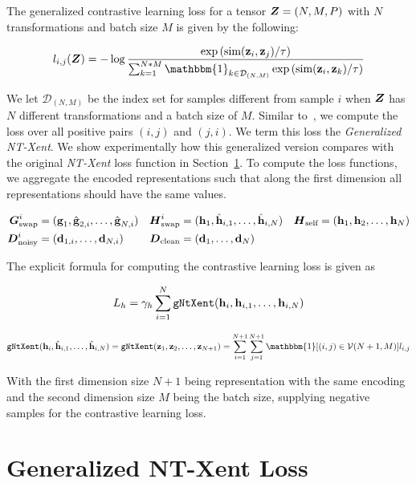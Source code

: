 \documentclass[11pt]{article}
\begin{document}
The generalized contrastive learning loss for a tensor $\boldsymbol{Z} = (N,M,P)$ with $N$ transformations and batch size $M$ is given by the following:

\begin{align}
  l_{i,j}(\mZ)
  =
  -\log
  \frac{
  \exp\left(\text{sim}(\vz_i,\vz_j)/\tau\right)
  }{
  \sum^{N*M}_{k=1}\mathbbm{1}_{k \in \mathcal{D}_{(N,M)}}\exp\left(\text{sim}(\vz_i,\vz_k)/\tau\right)
  }
\end{align}

We let $\mathcal{D}_{(N,M)}$ be the index set for samples different from sample $i$ when $\boldsymbol{Z}$ has $N$ different transformations and a batch size of $M$. Similar to~\cite{chen2020simple}, we compute the loss over all positive pairs $(i,j)$ and $(j,i)$. We term this loss the \emph{Generalized NT-Xent}.  We show experimentally how this generalized version compares with the original \emph{NT-Xent} loss function in Section~\ref{sec:gen_nt_xent}. To compute the loss functions, we aggregate the encoded representations such that along the first dimension all representations should have the same values.

\begin{align}\nonumber
  \boldsymbol{G}_{\text{swap}}^i &= (\boldsymbol{\mathrm{g}}_1,\hat{\boldsymbol{\mathrm{g}}}_{2,i},\ldots,\hat{\boldsymbol{\mathrm{g}}}_{N,i})                                 &
  \boldsymbol{H}_{\text{swap}}^i &= (\boldsymbol{\mathrm{h}}_1,\hat{\boldsymbol{\mathrm{h}}}_{i,1},\ldots,\hat{\boldsymbol{\mathrm{h}}}_{i,N}) & \boldsymbol{H}_{\text{self}} &= (\boldsymbol{\mathrm{h}}_1,\boldsymbol{\mathrm{h}}_2,\ldots,\boldsymbol{\mathrm{h}}_N)
   \\\nonumber                          
  \boldsymbol{D}_{\text{noisy}}^i &= (\boldsymbol{\mathrm{d}}_{1,i},\ldots,\boldsymbol{\mathrm{d}}_{N,i})
  &                     
  \boldsymbol{D}_{\text{clean}} &= (\boldsymbol{\mathrm{d}}_1,\ldots,\boldsymbol{\mathrm{d}}_N)
\end{align}

The explicit formula for computing the contrastive learning loss is given as

\[
  L_h = \gamma_h \sum_{i=1}^N {\tt gNtXent}(\boldsymbol{\mathrm{h}}_i,\boldsymbol{\mathrm{h}}_{i,1},\ldots,\boldsymbol{\mathrm{h}}_{i,N})
\]

\[
  {\tt gNtXent}(\vh_i,\hat{\vh}_{i,1},\ldots,\hat{\vh}_{i,N})
  =
  {\tt gNtXent}(\vz_1,\vz_2,\ldots,\vz_{N+1})
  =
  \sum_{i=1}^{N+1} \sum_{j=1}^{N+1} \mathbbm{1}[(i,j) \in \mathcal{V}(N+1,M)] l_{i,j}
\]

With the first dimension size $N+1$ being representation with the same encoding and the second dimension size $M$ being the batch size, supplying negative samples for the contrastive learning loss.

\newpage

\section{Generalized NT-Xent Loss}\label{sec:gen_nt_xent}
\end{document}
